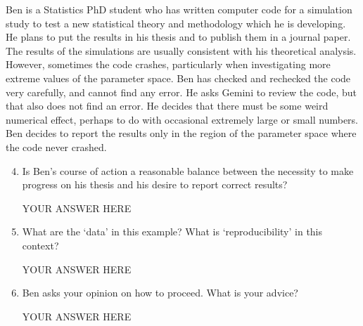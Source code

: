 \documentclass[12pt]{article}
\begin{document}
Ben is a Statistics PhD student who has written computer code for a simulation study to test a new statistical theory and methodology which he is developing.
He plans to put the results in his thesis and to publish them in a journal paper.
The results of the simulations are usually consistent with his theoretical analysis. 
However, sometimes the code crashes, particularly when investigating more extreme values of the parameter space.
Ben has checked and rechecked the code very carefully, and cannot find any error.
He asks Gemini to review the code, but that also does not find an error.
He decides that there must be some weird numerical effect, perhaps to do with occasional extremely large or small numbers.
Ben decides to report the results only in the region of the parameter space where the code never crashed. 
\begin{enumerate}\setcounter{enumi}{3}
\item Is Ben's course of action a reasonable balance between the necessity to make progress on his thesis and his desire to report correct results? 

YOUR ANSWER HERE

\item What are the `data' in this example? What is `reproducibility' in this context?

YOUR ANSWER HERE

\item Ben asks your opinion on how to proceed. What is your advice?

YOUR ANSWER HERE
\end{enumerate}
\end{document}
